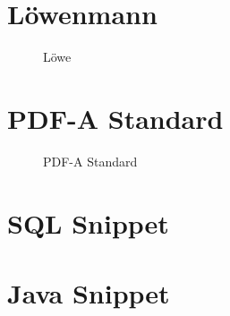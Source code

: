 %	
%

\section{Löwenmann} \label{a.1.pic}
\begin{figure}[h]
	\centering
	\caption{Löwe}
	\label{Löwe}
\end{figure}

\section{PDF-A Standard} \label{a.1.pdfa}
\begin{figure}[h]
	\centering
	\caption{PDF-A Standard}
\end{figure}

\newpage

\label{a.1.pdf}


\newpage

\section{SQL Snippet} \label{a.1.snippetSQL} 


\newpage

\section{Java Snippet} \label{a.1.snippetJAVA} 


\newpage